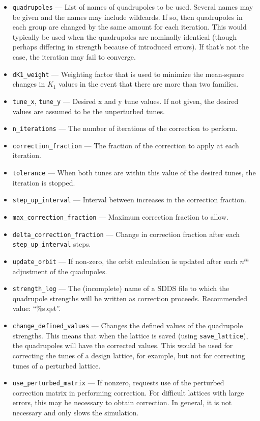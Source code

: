 \documentclass[11pt]{article}
\begin{document}
\begin{itemize}
\item \verb|quadrupoles| --- List of names of quadrupoles to be used.  Several names may be given and the names may include
  wildcards. If so, then quadrupoles in each group are changed by the same amount for each iteration.
  This would typically be used when the quadrupoles are nominally identical (though perhaps differing in strength because of
  introduced errors). If that's not the case, the iteration may fail to converge.
\item \verb|dK1_weight| --- Weighting factor that is used to minimize the mean-square changes in $K_1$ values in the
  event that there are more than two families.
\item \verb|tune_x|, \verb|tune_y| --- Desired x and y tune values.  If not given, the desired values are
assumed to be the unperturbed tunes.
\item \verb|n_iterations| --- The number of iterations of the correction to perform.
\item \verb|correction_fraction| --- The fraction of the correction to apply at each iteration.
\item \verb|tolerance| --- When both tunes are within this value of the desired tunes, the
iteration is stopped.
\item \verb|step_up_interval| --- Interval between increases in the correction fraction.
\item \verb|max_correction_fraction| --- Maximum correction fraction to allow.
\item \verb|delta_correction_fraction| --- Change in correction fraction after 
each \verb|step_up_interval| steps.
\item \verb|update_orbit| --- If non-zero, the orbit calculation is updated after each $n^{th}$ adjustment of the
  quadupoles. 
\item \verb|strength_log| --- The (incomplete) name of a SDDS file to which the quadrupole 
strengths will be written as correction proceeds.  Recommended value: ``\%s.qst''.
\item \verb|change_defined_values| --- Changes the defined values of the quadrupole strengths.
This means that when the lattice is saved (using \verb|save_lattice|), the quadrupoles will
have the corrected values.  This would be used for correcting the tunes of a design
lattice, for example, but not for correcting tunes of a perturbed lattice.
\item \verb|use_perturbed_matrix| --- If nonzero, requests use of the perturbed correction matrix in
performing correction.  For difficult lattices with large errors, this may be necessary
to obtain correction.  In general, it is not necessary and only slows the simulation.
\end{itemize}
\end{document}
